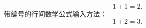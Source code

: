 \documentclass[a5paper,12pt]{ctexart}
\begin{document}
    \begin{equation}
        1 + 1 = 2.
    \end{equation}
    带编号的行间数学公式输入方法：
    \begin{equation}
        1 + 2 = 3.
    \end{equation}
\end{document}
